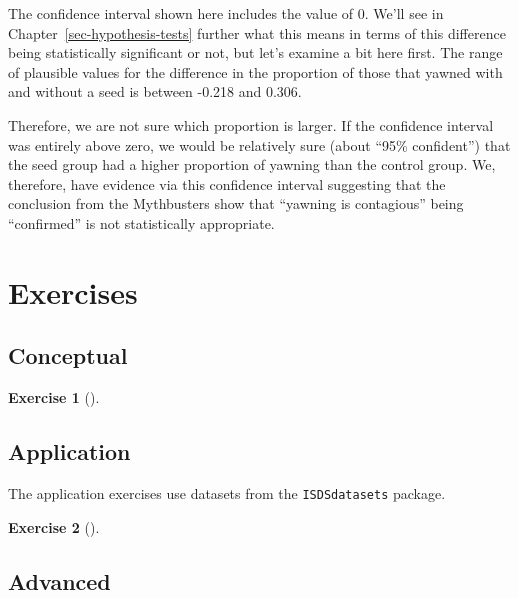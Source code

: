 \documentclass[
  letterpaper,
  DIV=11,
  numbers=noendperiod]{scrreprt}
\theoremstyle{definition}
\newtheorem{exercise}{Exercise}[chapter]
\theoremstyle{remark}
\begin{document}
The confidence interval shown here includes the value of 0. We'll see in
Chapter~\ref{sec-hypothesis-tests} further what this means in terms of
this difference being statistically significant or not, but let's
examine a bit here first. The range of plausible values for the
difference in the proportion of those that yawned with and without a
seed is between -0.218 and 0.306.

Therefore, we are not sure which proportion is larger. If the confidence
interval was entirely above zero, we would be relatively sure (about
``95\% confident'') that the seed group had a higher proportion of
yawning than the control group. We, therefore, have evidence via this
confidence interval suggesting that the conclusion from the Mythbusters
show that ``yawning is contagious'' being ``confirmed'' is not
statistically appropriate.

\hypertarget{sec-ex10}{%
\section{Exercises}\label{sec-ex10}}

\hypertarget{sec-ex10-conceptual}{%
\subsection{Conceptual}\label{sec-ex10-conceptual}}

\leavevmode{}%
\begin{exercise}[]\label{exr-ch10-c01}

\end{exercise}

\hypertarget{sec-ex10-application}{%
\subsection{Application}\label{sec-ex10-application}}

The application exercises use datasets from the \texttt{ISDSdatasets}
package.

\leavevmode{}%
\begin{exercise}[]\label{exr-ch10-app1}

\end{exercise}

\hypertarget{sec-ex10-advanced}{%
\subsection{Advanced}\label{sec-ex10-advanced}}
\end{document}
